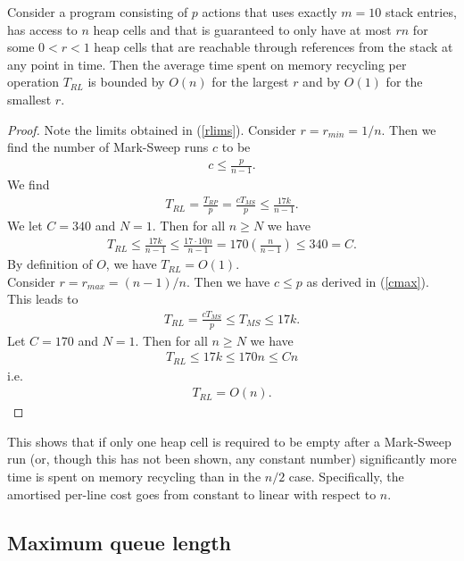 \documentclass{article}
\begin{document}
\begin{claim}
    Consider a program consisting of $p$ actions that uses exactly $m=10$
    stack entries, has access to $n$ heap cells and that is guaranteed to only
    have at most $rn$ for some $0<r<1$ heap cells that are reachable through references
    from the stack at any point in time.
    Then the average time spent on memory recycling per operation $T_{RL}$ is bounded by $O(n)$ for
    the largest $r$ and by $O(1)$ for the smallest $r$.
\end{claim}

\begin{proof}
    Note the limits obtained in (\ref{rlims}). Consider $r=r_{min}=1/n$. Then we find
    the number of Mark-Sweep runs $c$ to be
    \begin{align*}
      c \leq \frac{p}{n-1}.  
    \end{align*}
    We find
    \begin{align*}
        T_{RL} = \frac{T_{RP}}{p} = \frac{cT_{MS}}{p} \leq \frac{17k}{n-1}.
    \end{align*}
    We let $C=340$ and $N=1$. Then for all $n\geq N$ we have
    \begin{align*}
        T_{RL} \leq \frac{17k}{n-1} \leq \frac{17\cdot 10n}{n-1} = 170\left(\frac{n}{n-1}\right) \leq 340 = C.
    \end{align*}
    By definition of $O$, we have $T_{RL}=O(1)$.\\
    Consider $r=r_{max}=(n-1)/n$. Then we have $c\leq p$ as derived in (\ref{cmax}).
    This leads to
    \begin{align*}
        T_{RL}=\frac{cT_{MS}}{p}\leq T_{MS} \leq 17k.
    \end{align*}
    Let $C=170$ and $N=1$. Then for all $n\geq N$ we have
    \begin{align*}
        T_{RL} \leq 17k \leq 170n \leq Cn
    \end{align*}
    i.e.
    \begin{align*}
        T_{RL} = O(n).
    \end{align*}
\end{proof}
This shows that if only one heap cell is required to be empty after a Mark-Sweep run
(or, though this has not been shown, any constant number) significantly more time is
spent on memory recycling than in the $n/2$ case. Specifically, the amortised per-line
cost goes from constant to linear with respect to $n$.

\subsection{Maximum queue length}
\end{document}
